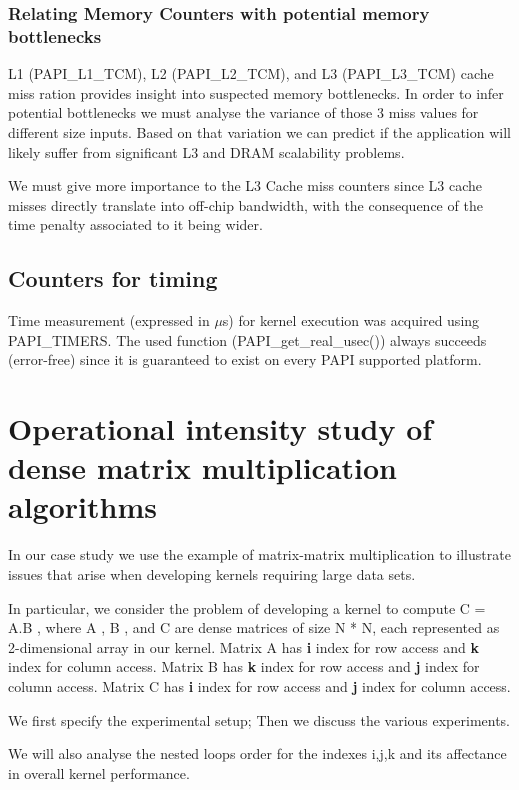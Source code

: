 \documentclass{sigplanconf}
\begin{document}
\subsubsection{Relating Memory Counters with potential memory bottlenecks}
L1 (PAPI\_L1\_TCM), L2 (PAPI\_L2\_TCM), and L3 (PAPI\_L3\_TCM) cache miss ration provides insight into suspected memory bottlenecks. In order to infer potential bottlenecks we must analyse the variance of those 3 miss values for different size inputs. Based on that variation we can predict if the application will likely suffer from significant L3 and DRAM scalability problems. \par We must give more importance to the L3 Cache miss counters since L3 cache misses directly translate into off-chip bandwidth, with the consequence of the time penalty associated to it being wider.\par 
\subsection{Counters for timing}
Time measurement (expressed in $\mu$s) for kernel execution was acquired using PAPI\_TIMERS. The used function (PAPI\_get\_real\_usec()) always succeeds (error-free) since it is guaranteed to exist on every PAPI supported platform.



\section{Operational intensity study of dense matrix multiplication algorithms}

In our case study we use the example of matrix-matrix multiplication to illustrate issues that arise when developing kernels requiring large data sets. 
\par In particular, we consider the problem of developing a kernel to compute C = A.B , where A , B , and C are dense matrices of size N * N, each represented as 2-dimensional array in our kernel. Matrix A has \textbf{i} index for row access and \textbf{k} index for column access.
Matrix B has \textbf{k} index for row access and \textbf{j} index for column access. Matrix C has \textbf{i} index for row access and \textbf{j} index for column access.\par 
We first specify the experimental setup; Then
we discuss the various experiments. \par 
We will also analyse the nested loops order for the indexes i,j,k and its affectance in overall kernel performance.
\end{document}

